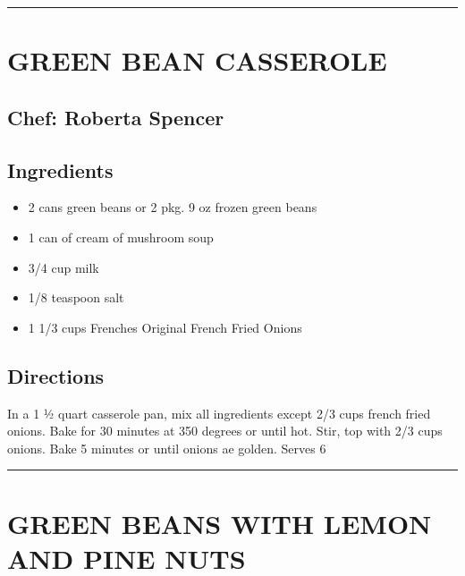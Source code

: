 \documentclass[
]{book}
\providecommand{\tightlist}{%
  \setlength{\itemsep}{0pt}\setlength{\parskip}{0pt}}
\begin{document}
\begin{center}\rule{0.5\linewidth}{0.5pt}\end{center}

\hypertarget{green-bean-casserole}{%
\section*{GREEN BEAN CASSEROLE}\label{green-bean-casserole}}


\hypertarget{chef-roberta-spencer-6}{%
\subsection*{Chef: Roberta Spencer}\label{chef-roberta-spencer-6}}


\hypertarget{ingredients-31}{%
\subsection*{Ingredients}\label{ingredients-31}}


\begin{itemize}
\tightlist
\item
  2 cans green beans or 2 pkg. 9 oz frozen green beans
\item
  1 can of cream of mushroom soup
\item
  3/4 cup milk
\item
  1/8 teaspoon salt
\item
  1 1/3 cups Frenches Original French Fried Onions
\end{itemize}

\hypertarget{directions-31}{%
\subsection*{Directions}\label{directions-31}}


In a 1 ½ quart casserole pan, mix all ingredients except 2/3 cups french fried onions.
Bake for 30 minutes at 350 degrees or until hot. Stir, top with 2/3 cups onions.
Bake 5 minutes or until onions ae golden. Serves 6

\begin{center}\rule{0.5\linewidth}{0.5pt}\end{center}

\hypertarget{green-beans-with-lemon-and-pine-nuts}{%
\section*{GREEN BEANS WITH LEMON AND PINE NUTS}\label{green-beans-with-lemon-and-pine-nuts}}
\end{document}
